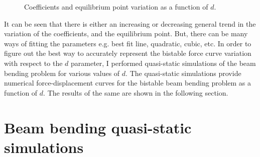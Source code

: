\documentclass[10pt]{article}
\begin{document}
\begin{figure}[h]
\caption{Coefficients and equilibrium point variation as a function of $d$.}
\label{fig:coeff2}
\end{figure}
It can be seen that there is either an increasing or decreasing general trend in the variation of the coefficients, and the equilibrium point. But, there can be many ways of fitting the parameters e.g. best fit line, quadratic, cubic, etc. In order to figure out the best way to accurately represent the bistable force curve variation with respect to the $d$ parameter, I performed quasi-static simulations of the beam bending problem for various values of $d$. The quasi-static simulations provide numerical force-displacement curves for the bistable beam bending problem as a function of $d$. The results of the same are shown in the following section.

\section{Beam bending quasi-static simulations}
\end{document}
